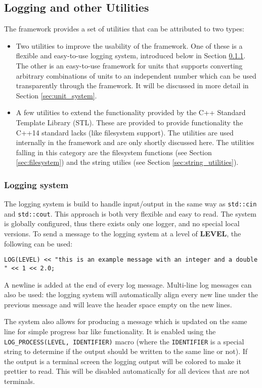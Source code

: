 \subsection{Logging and other Utilities}
\label{sec:logging_utilities}
The \apsq framework provides a set of utilities that can be attributed to two types:
\begin{itemize}
\item Two utilities to improve the usability of the framework. One of these is a flexible and easy-to-use logging system, introduced below in Section \ref{sec:logger}. The other is an easy-to-use framework for units that supports converting arbitrary combinations of units to an independent number which can  be used transparently through the framework. It will be discussed in more detail in Section \ref{sec:unit_system}.
\item A few utilities to extend the functionality provided by the C++ Standard Template Library (STL). These are provided to provide functionality the C++14 standard lacks (like filesystem support). The utilities are used internally in the framework and are only shortly discussed here. The utilities falling in this category are the filesystem functions (see Section \ref{sec:filesystem}) and the string utilies (see Section \ref{sec:string_utilities}).
\end{itemize}

\subsubsection{Logging system}
\label{sec:logger}
The logging system is build to handle input/output in the same way as \texttt{std::cin} and \texttt{std::cout}. This approach is both very flexible and easy to read. The system is globally configured, thus there exists only one logger, and no special local versions. To send a message to the logging system at a level of \textbf{LEVEL}, the following can be used:
\begin{verbatim}
LOG(LEVEL) << "this is an example message with an integer and a double " << 1 << 2.0;
\end{verbatim}
A newline is added at the end of every log message. Multi-line log messages can also be used: the logging system will automatically align every new line under the previous message and will leave the header space empty on the new lines. 

The system also allows for producing a message which is updated on the same line for simple progress bar like functionality. It is enabled using the \texttt{LOG\_PROCESS(LEVEL, IDENTIFIER)} macro (where the \texttt{IDENTIFIER} is a special string to determine if the output should be written to the same line or not). If the output is a terminal screen the logging output will be colored to make it prettier to read. This will be disabled automatically for all devices that are not terminals.


